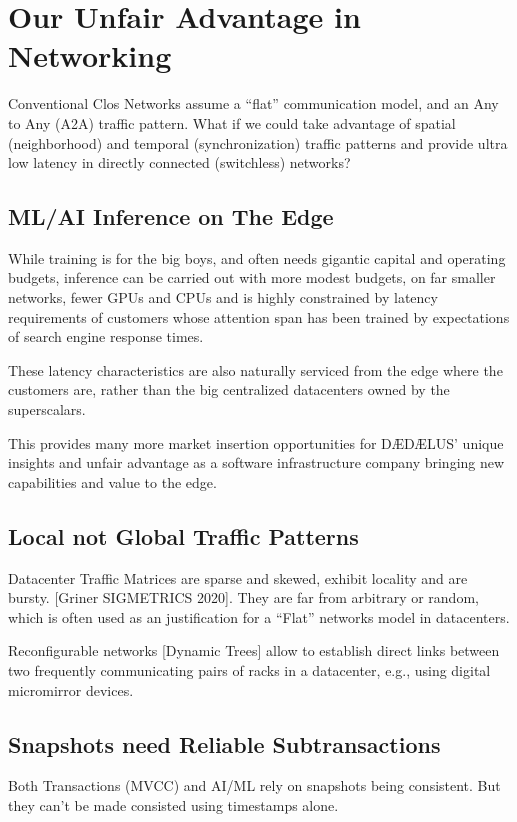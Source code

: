 \documentclass[../../../OAE-SPEC-MAIN.tex]{subfiles}
\begin{document}
\section{Our Unfair Advantage in Networking}

Conventional Clos Networks assume a “flat” communication model, and an Any to Any (A2A) traffic pattern.  What if we could take advantage of spatial (neighborhood) and temporal (synchronization) traffic patterns and provide ultra low latency in directly connected (switchless) networks?

\subsection{ML/AI Inference on The Edge}

While training is for the big boys, and often needs gigantic capital and operating budgets, inference can be carried out with more modest budgets, on far smaller networks, fewer GPUs and CPUs and is highly constrained by latency requirements of customers whose attention span has been trained by expectations of search engine response times.

These latency characteristics are also naturally serviced from the edge where the customers are, rather than the big centralized datacenters owned by the superscalars.

This provides many more market insertion opportunities for DÆDÆLUS’ unique insights and unfair advantage as a software infrastructure company bringing new capabilities and value to the edge. 

\subsection{Local not Global Traffic Patterns}
Datacenter Traffic Matrices are sparse and skewed, exhibit locality and are bursty. [Griner SIGMETRICS 2020]. They are far from arbitrary or random, which is often used as an justification for a “Flat” networks model in datacenters.

Reconfigurable networks [Dynamic Trees]  allow to establish direct links between two frequently communicating pairs of racks in a datacenter, e.g., using digital micromirror devices.

\subsection{Snapshots need Reliable Subtransactions}
Both Transactions (MVCC) and AI/ML rely on snapshots being consistent. But they can’t be made consisted using timestamps alone.
\end{document}
